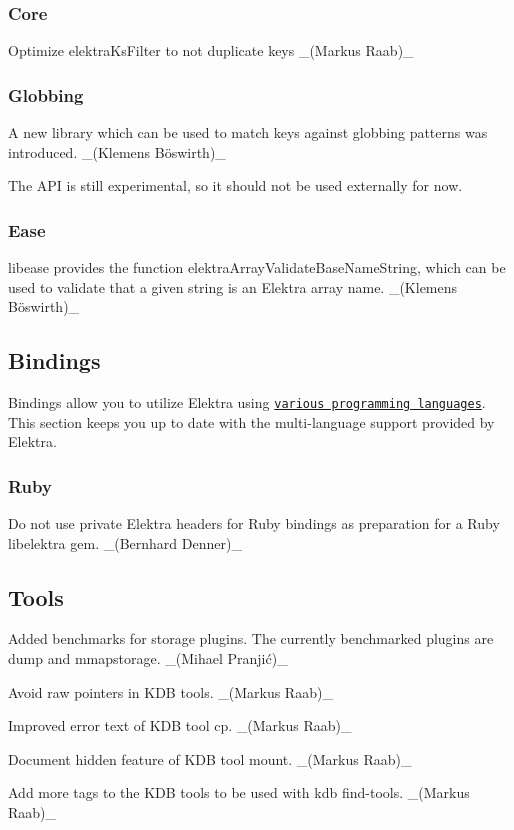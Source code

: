 \subsubsection*{Core}

Optimize elektra\+Ks\+Filter to not duplicate keys \+\_\+(\+Markus Raab)\+\_\+

\subsubsection*{Globbing}

A new library which can be used to match keys against globbing patterns was introduced. \+\_\+(Klemens Böswirth)\+\_\+

The A\+PI is still experimental, so it should not be used externally for now.

\subsubsection*{Ease}

{\ttfamily libease} provides the function {\ttfamily elektra\+Array\+Validate\+Base\+Name\+String}, which can be used to validate that a given string is an Elektra array name. \+\_\+(Klemens Böswirth)\+\_\+

\subsection*{Bindings}

Bindings allow you to utilize Elektra using \href{https://www.libelektra.org/bindings/readme}{\tt various programming languages}. This section keeps you up to date with the multi-\/language support provided by Elektra.

\subsubsection*{Ruby}

Do not use private Elektra headers for Ruby bindings as preparation for a Ruby {\ttfamily libelektra} gem. \+\_\+(\+Bernhard Denner)\+\_\+

\subsection*{Tools}


\begin{DoxyItemize}
\item Added benchmarks for storage plugins. The currently benchmarked plugins are {\ttfamily dump} and {\ttfamily mmapstorage}. \+\_\+(Mihael Pranjić)\+\_\+
\item Avoid raw pointers in K\+DB tools. \+\_\+(\+Markus Raab)\+\_\+
\item Improved error text of K\+DB tool {\ttfamily cp}. \+\_\+(\+Markus Raab)\+\_\+
\item Document hidden feature of K\+DB tool {\ttfamily mount}. \+\_\+(\+Markus Raab)\+\_\+
\item Add more tags to the K\+DB tools to be used with {\ttfamily kdb find-\/tools}. \+\_\+(\+Markus Raab)\+\_\+
\end{DoxyItemize}

